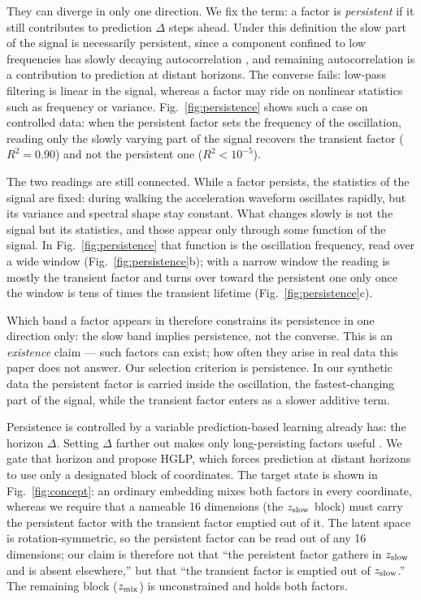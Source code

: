 They can diverge in only one direction. We fix the term: a factor is \emph{persistent} if it still contributes to prediction $\Delta$ steps ahead. Under this definition the slow part of the signal is necessarily persistent, since a component confined to low frequencies has slowly decaying autocorrelation \cite{khinchin1934}, and remaining autocorrelation is a contribution to prediction at distant horizons. The converse fails: low-pass filtering is linear in the signal, whereas a factor may ride on nonlinear statistics such as frequency or variance. Fig.~\ref{fig:persistence} shows such a case on controlled data: when the persistent factor sets the frequency of the oscillation, reading only the slowly varying part of the signal recovers the transient factor ($R^2 = 0.90$) and not the persistent one ($R^2 < 10^{-5}$).

The two readings are still connected. While a factor persists, the statistics of the signal are fixed: during walking the acceleration waveform oscillates rapidly, but its variance and spectral shape stay constant. What changes slowly is not the signal but its statistics, and those appear only through some function of the signal. In Fig.~\ref{fig:persistence} that function is the oscillation frequency, read over a wide window (Fig.~\ref{fig:persistence}b); with a narrow window the reading is mostly the transient factor and turns over toward the persistent one only once the window is tens of times the transient lifetime (Fig.~\ref{fig:persistence}c).

Which band a factor appears in therefore constrains its persistence in one direction only: the slow band implies persistence, not the converse. This is an \emph{existence} claim --- such factors can exist; how often they arise in real data this paper does not answer. Our selection criterion is persistence. In our synthetic data the persistent factor is carried inside the oscillation, the fastest-changing part of the signal, while the transient factor enters as a slower additive term.

Persistence is controlled by a variable prediction-based learning already has: the horizon $\Delta$. Setting $\Delta$ farther out makes only long-persisting factors useful \cite{bialek2001, creutzig2008}. We gate that horizon and propose HGLP, which forces prediction at distant horizons to use only a designated block of coordinates. The target state is shown in Fig.~\ref{fig:concept}: an ordinary embedding mixes both factors in every coordinate, whereas we require that a nameable 16 dimensions (the $z_{\mathrm{slow}}$ block) must carry the persistent factor with the transient factor emptied out of it. The latent space is rotation-symmetric, so the persistent factor can be read out of any 16 dimensions; our claim is therefore not that ``the persistent factor gathers in $z_{\mathrm{slow}}$ and is absent elsewhere,'' but that ``the transient factor is emptied out of $z_{\mathrm{slow}}$.'' The remaining block ($z_{\mathrm{mix}}$) is unconstrained and holds both factors.

